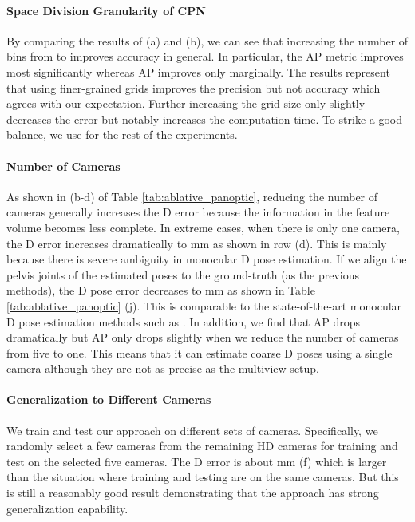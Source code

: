 \documentclass[runningheads]{llncs}
\begin{document}
\paragraph{\textbf{Space Division Granularity of CPN}}
By comparing the results of (a) and (b), we can see that increasing the number of bins from  to  improves accuracy in general. In particular, the AP metric improves most significantly whereas AP improves only marginally. The results represent that using finer-grained grids improves the precision but not accuracy which agrees with our expectation. Further increasing the grid size only slightly decreases the error but notably increases the computation time. To strike a good balance, we use  for the rest of the experiments.

\paragraph{\textbf{Number of Cameras}}
As shown in (b-d) of Table \ref{tab:ablative_panoptic}, reducing the number of cameras generally increases the D error because the information in the feature volume becomes less complete. In extreme cases, when there is only one camera, the D error increases dramatically to mm as shown in row (d). This is mainly because there is severe ambiguity in monocular D pose estimation. If we align the pelvis joints of the estimated poses to the ground-truth (as the previous methods), the D pose error decreases to mm as shown in Table \ref{tab:ablative_panoptic} (j). This is comparable to the state-of-the-art monocular D pose estimation methods such as \cite{martinez2017simple,ci2019lcn,iskakov2019learnable}. In addition, we find that AP drops dramatically but AP only drops slightly when we reduce the number of cameras from five to one. This means that it can estimate coarse D poses using a single camera although they are not as precise as the multiview setup.

\paragraph{\textbf{Generalization to Different Cameras}} We  train and test our approach on different sets of cameras. Specifically, we randomly select a few cameras from the remaining HD cameras for training and test on the selected five cameras. The D error is about mm (f) which is larger than the situation where training and testing are on the same cameras. But this is still a reasonably good result demonstrating that the approach has strong generalization capability.
\end{document}
